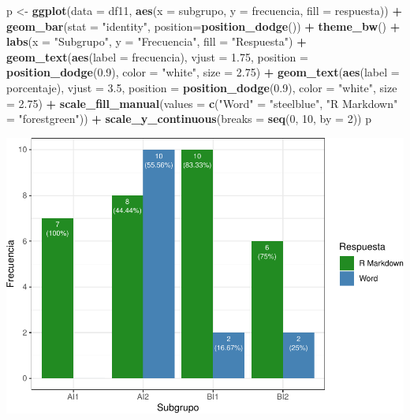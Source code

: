 \documentclass[
]{article}
\newenvironment{Shaded}{\begin{snugshade}}{\end{snugshade}}
\newcommand{\AttributeTok}[1]{\textcolor[rgb]{0.13,0.29,0.53}{#1}}
\newcommand{\DecValTok}[1]{\textcolor[rgb]{0.00,0.00,0.81}{#1}}
\newcommand{\FloatTok}[1]{\textcolor[rgb]{0.00,0.00,0.81}{#1}}
\newcommand{\FunctionTok}[1]{\textcolor[rgb]{0.13,0.29,0.53}{\textbf{#1}}}
\newcommand{\NormalTok}[1]{#1}
\newcommand{\OtherTok}[1]{\textcolor[rgb]{0.56,0.35,0.01}{#1}}
\newcommand{\SpecialCharTok}[1]{\textcolor[rgb]{0.81,0.36,0.00}{\textbf{#1}}}
\newcommand{\StringTok}[1]{\textcolor[rgb]{0.31,0.60,0.02}{#1}}
\begin{document}
\begin{Shaded}
\begin{Highlighting}[]
\NormalTok{p }\OtherTok{\textless{}{-}} \FunctionTok{ggplot}\NormalTok{(}\AttributeTok{data =}\NormalTok{ df11, }\FunctionTok{aes}\NormalTok{(}\AttributeTok{x =}\NormalTok{ subgrupo, }\AttributeTok{y =}\NormalTok{ frecuencia, }\AttributeTok{fill =}\NormalTok{ respuesta)) }\SpecialCharTok{+} 
  \FunctionTok{geom\_bar}\NormalTok{(}\AttributeTok{stat =} \StringTok{"identity"}\NormalTok{, }\AttributeTok{position=}\FunctionTok{position\_dodge}\NormalTok{()) }\SpecialCharTok{+}
  \FunctionTok{theme\_bw}\NormalTok{() }\SpecialCharTok{+} \FunctionTok{labs}\NormalTok{(}\AttributeTok{x =} \StringTok{"Subgrupo"}\NormalTok{, }\AttributeTok{y =} \StringTok{"Frecuencia"}\NormalTok{, }\AttributeTok{fill =} \StringTok{"Respuesta"}\NormalTok{) }\SpecialCharTok{+}
  \FunctionTok{geom\_text}\NormalTok{(}\FunctionTok{aes}\NormalTok{(}\AttributeTok{label =}\NormalTok{ frecuencia), }\AttributeTok{vjust =} \FloatTok{1.75}\NormalTok{, }\AttributeTok{position =} \FunctionTok{position\_dodge}\NormalTok{(}\FloatTok{0.9}\NormalTok{), }
            \AttributeTok{color =} \StringTok{"white"}\NormalTok{, }\AttributeTok{size =} \FloatTok{2.75}\NormalTok{) }\SpecialCharTok{+}
  \FunctionTok{geom\_text}\NormalTok{(}\FunctionTok{aes}\NormalTok{(}\AttributeTok{label =}\NormalTok{ porcentaje), }\AttributeTok{vjust =} \FloatTok{3.5}\NormalTok{, }\AttributeTok{position =} \FunctionTok{position\_dodge}\NormalTok{(}\FloatTok{0.9}\NormalTok{), }
            \AttributeTok{color =} \StringTok{"white"}\NormalTok{, }\AttributeTok{size =} \FloatTok{2.75}\NormalTok{) }\SpecialCharTok{+}
  \FunctionTok{scale\_fill\_manual}\NormalTok{(}\AttributeTok{values =} \FunctionTok{c}\NormalTok{(}\StringTok{"Word"} \OtherTok{=} \StringTok{"steelblue"}\NormalTok{, }\StringTok{"R Markdown"} \OtherTok{=} \StringTok{"forestgreen"}\NormalTok{)) }\SpecialCharTok{+}
  \FunctionTok{scale\_y\_continuous}\NormalTok{(}\AttributeTok{breaks =} \FunctionTok{seq}\NormalTok{(}\DecValTok{0}\NormalTok{, }\DecValTok{10}\NormalTok{, }\AttributeTok{by =} \DecValTok{2}\NormalTok{))}
\NormalTok{p}
\end{Highlighting}
\end{Shaded}

\includegraphics{informe_files/figure-latex/unnamed-chunk-12-1.pdf}
\end{document}
